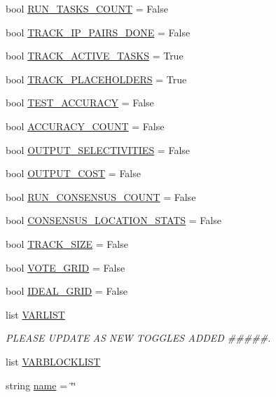 \begin{DoxyCompactItemize}
\item 
bool \hyperlink{namespacereorder_a904bebe166c12146cac5f4dec979450c}{R\+U\+N\+\_\+\+T\+A\+S\+K\+S\+\_\+\+C\+O\+U\+NT} = False
\item 
bool \hyperlink{namespacereorder_ac1bb03e2d3e1f9304e6628d802795547}{T\+R\+A\+C\+K\+\_\+\+I\+P\+\_\+\+P\+A\+I\+R\+S\+\_\+\+D\+O\+NE} = False
\item 
bool \hyperlink{namespacereorder_a9c5fce243b39b491bbdf705555a92617}{T\+R\+A\+C\+K\+\_\+\+A\+C\+T\+I\+V\+E\+\_\+\+T\+A\+S\+KS} = True
\item 
bool \hyperlink{namespacereorder_a2be074e9eca6d662578ca68c95050ad3}{T\+R\+A\+C\+K\+\_\+\+P\+L\+A\+C\+E\+H\+O\+L\+D\+E\+RS} = True
\item 
bool \hyperlink{namespacereorder_a899bd5bdb20b1d0a0592390572cc4e87}{T\+E\+S\+T\+\_\+\+A\+C\+C\+U\+R\+A\+CY} = False
\item 
bool \hyperlink{namespacereorder_ae898ca1b1c4681151406ecc2921a738b}{A\+C\+C\+U\+R\+A\+C\+Y\+\_\+\+C\+O\+U\+NT} = False
\item 
bool \hyperlink{namespacereorder_ac8f124f313b63d29e1664ff5fc7a049f}{O\+U\+T\+P\+U\+T\+\_\+\+S\+E\+L\+E\+C\+T\+I\+V\+I\+T\+I\+ES} = False
\item 
bool \hyperlink{namespacereorder_a2c3c37ecd0a669270751ba1fcdc0439f}{O\+U\+T\+P\+U\+T\+\_\+\+C\+O\+ST} = False
\item 
bool \hyperlink{namespacereorder_ab852b5e6373777202ed3eabdf511f026}{R\+U\+N\+\_\+\+C\+O\+N\+S\+E\+N\+S\+U\+S\+\_\+\+C\+O\+U\+NT} = False
\item 
bool \hyperlink{namespacereorder_ad7f3dbdec359eb538bf1890793d541ad}{C\+O\+N\+S\+E\+N\+S\+U\+S\+\_\+\+L\+O\+C\+A\+T\+I\+O\+N\+\_\+\+S\+T\+A\+TS} = False
\item 
bool \hyperlink{namespacereorder_a2051e4cd9bae895351ea7a73696fd815}{T\+R\+A\+C\+K\+\_\+\+S\+I\+ZE} = False
\item 
bool \hyperlink{namespacereorder_abd2acb6c03d6ca650537592475fc69e4}{V\+O\+T\+E\+\_\+\+G\+R\+ID} = False
\item 
bool \hyperlink{namespacereorder_a42311c82a77ac3b1c03bf7b9c6619be2}{I\+D\+E\+A\+L\+\_\+\+G\+R\+ID} = False
\item 
list \hyperlink{namespacereorder_abad4087652ccca08b33c499c7aad17b0}{V\+A\+R\+L\+I\+ST}
\begin{DoxyCompactList}\small\item\em P\+L\+E\+A\+SE U\+P\+D\+A\+TE AS N\+EW T\+O\+G\+G\+L\+ES A\+D\+D\+ED \#\#\#\#\#. \end{DoxyCompactList}\item 
list \hyperlink{namespacereorder_aa02a2d2c1773074f98b23ad1078b99da}{V\+A\+R\+B\+L\+O\+C\+K\+L\+I\+ST}
\item 
string \hyperlink{namespacereorder_a8ccf841cb59e451791bcb2e1ac4f1edc}{name} = \char`\"{}\char`\"{}
\end{DoxyCompactItemize}


